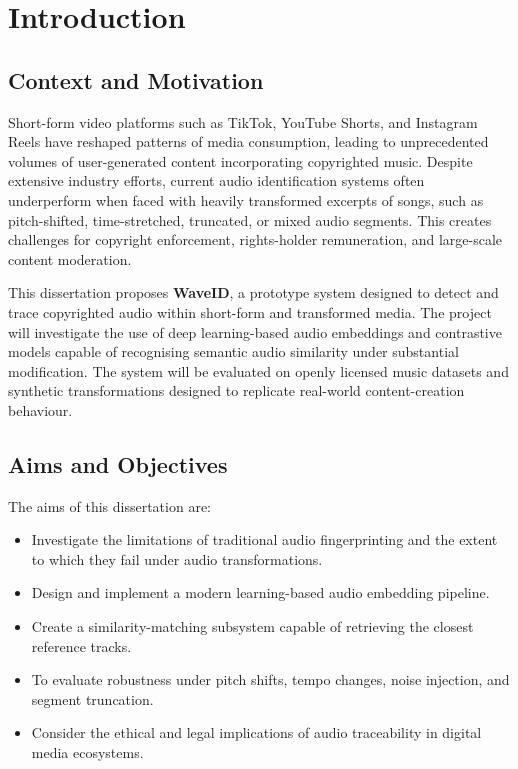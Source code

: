 \documentclass[../Thesis]{subfiles}
\begin{document}
\chapter{Introduction} \label{chapter1}
\section{Context and Motivation}
Short-form video platforms such as TikTok, YouTube Shorts, and Instagram Reels have reshaped patterns of media consumption, leading to unprecedented volumes of user-generated content incorporating copyrighted music. Despite extensive industry efforts, current audio identification systems often underperform when faced with heavily transformed excerpts of songs, such as pitch-shifted, time-stretched, truncated, or mixed audio segments. This creates challenges for copyright enforcement, rights-holder remuneration, and large-scale content moderation.

This dissertation proposes \textbf{WaveID}, a prototype system designed to detect and trace copyrighted audio within short-form and transformed media. The project will investigate the use of deep learning-based audio embeddings and contrastive models capable of recognising semantic audio similarity under substantial modification. The system will be evaluated on openly licensed music datasets and synthetic transformations designed to replicate real-world content-creation behaviour.

\section{Aims and Objectives}
The aims of this dissertation are:
\begin{itemize}
    \item Investigate the limitations of traditional audio fingerprinting and the extent to which they fail under audio transformations.
    \item Design and implement a modern learning-based audio embedding pipeline.
    \item Create a similarity-matching subsystem capable of retrieving the closest reference tracks.
    \item To evaluate robustness under pitch shifts, tempo changes, noise injection, and segment truncation.
    \item Consider the ethical and legal implications of audio traceability in digital media ecosystems.
\end{itemize}
\end{document}
